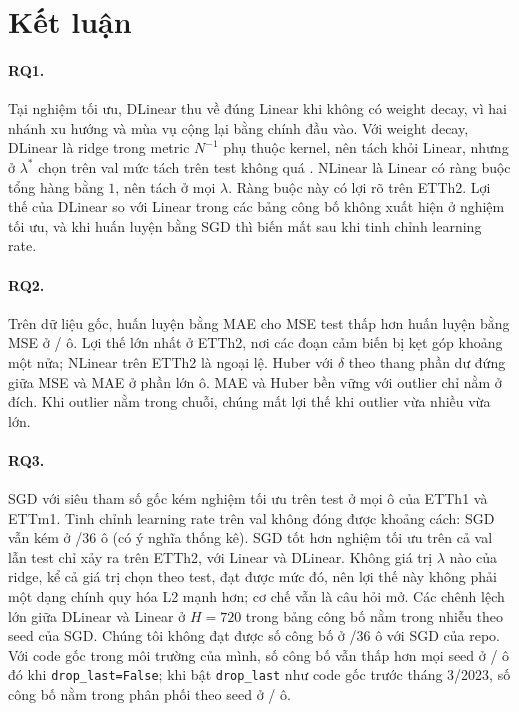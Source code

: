 \section{Kết luận}
\label{sec:conclusion}

\paragraph{RQ1.} Tại nghiệm tối ưu, DLinear thu về đúng Linear khi không có weight decay, vì hai nhánh xu hướng và mùa vụ cộng lại bằng chính đầu vào. Với weight decay, DLinear là ridge trong metric $N^{-1}$ phụ thuộc kernel, nên tách khỏi Linear, nhưng ở $\lambda^*$ chọn trên val mức tách trên test không quá \nmBThreeDLinMinusLinAllAbsMax. NLinear là Linear có ràng buộc tổng hàng bằng $1$, nên tách ở mọi $\lambda$. Ràng buộc này có lợi rõ trên ETTh2. Lợi thế của DLinear so với Linear trong các bảng công bố không xuất hiện ở nghiệm tối ưu, và khi huấn luyện bằng SGD thì biến mất sau khi tinh chỉnh learning rate.

\paragraph{RQ2.} Trên dữ liệu gốc, huấn luyện bằng MAE cho MSE test thấp hơn huấn luyện bằng MSE ở \nmBThreeMaeBeatsMseTotalCount/\nmBThreeCellCount{} ô. Lợi thế lớn nhất ở ETTh2, nơi các đoạn cảm biến bị kẹt góp khoảng một nửa; NLinear trên ETTh2 là ngoại lệ. Huber với $\delta$ theo thang phần dư đứng giữa MSE và MAE ở phần lớn ô. MAE và Huber bền vững với outlier chỉ nằm ở đích. Khi outlier nằm trong chuỗi, chúng mất lợi thế khi outlier vừa nhiều vừa lớn.

\paragraph{RQ3.} SGD với siêu tham số gốc kém nghiệm tối ưu trên test ở mọi ô của ETTh1 và ETTm1. Tinh chỉnh learning rate trên val không đóng được khoảng cách: SGD vẫn kém ở \nmTunedWorseSigCount/36 ô (có ý nghĩa thống kê). SGD tốt hơn nghiệm tối ưu trên cả val lẫn test chỉ xảy ra trên ETTh2, với Linear và DLinear. Không giá trị $\lambda$ nào của ridge, kể cả giá trị chọn theo test, đạt được mức đó, nên lợi thế này không phải một dạng chính quy hóa L2 mạnh hơn; cơ chế vẫn là câu hỏi mở. Các chênh lệch lớn giữa DLinear và Linear ở $H = 720$ trong bảng công bố nằm trong nhiễu theo seed của SGD. Chúng tôi không đạt được số công bố ở \nmBOneOutsideCount/36 ô với SGD của repo. Với code gốc trong môi trường của mình, số công bố vẫn thấp hơn mọi seed ở \nmDropPubBelowFalseCount/\nmDropCellCount{} ô đó khi \texttt{drop\_last=False}; khi bật \texttt{drop\_last} như code gốc trước tháng 3/2023, số công bố nằm trong phân phối theo seed ở \nmDropPubInTrueCount/\nmDropCellCount{} ô.
